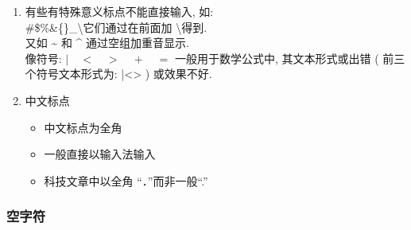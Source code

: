 \documentclass[UTF8]{ctexart}
\begin{document}
\begin{enumerate}
                \item 有些有特殊意义标点不能直接输入, 如: 
                \\\#\quad\$\quad\%\quad\&\quad\{\quad\}\quad\_\quad\textbackslash 它们通过在前面加 \textbackslash 得到. 
                \\ 又如 \~{} 和 \^{} 通过空组加重音显示. 
                \\ 像符号: $|\quad <\quad >\quad +\quad =$ 一般用于数学公式中, 其文本形式或出错 ( 前三个符号文本形式为: |\quad<\quad> ) 或效果不好. 

                \item 中文标点
                \begin{itemize}
                    \item 中文标点为全角
                    \item 一般直接以输入法输入
                    \item 科技文章中以全角 ``．''而非一般``.''
                \end{itemize}

            \end{enumerate}

        \subsubsection{空字符}
\end{document}

